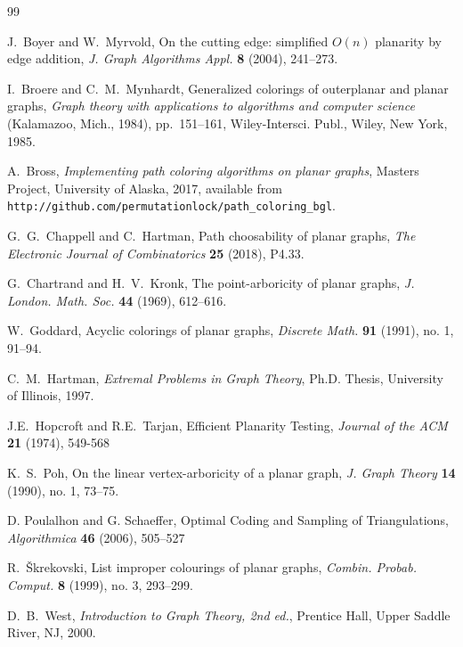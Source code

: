 \documentclass[12pt,letterpaper]{article}
\theoremstyle{plain}
\theoremstyle{definition}
\theoremstyle{break}
\begin{document}
\begin{thebibliography}{99}

J.~Boyer and W.~Myrvold, On the cutting edge: simplified $O(n)$ planarity by edge
addition,
\textit{J. Graph Algorithms Appl.}
\textbf{8} (2004),
241--273.

I.~Broere and C.~M.~Mynhardt,
Generalized colorings of outerplanar and planar graphs,
\textit{Graph theory with applications to algorithms and computer science}
 (Kalamazoo, Mich., 1984),
pp.~151--161,
Wiley-Intersci. Publ., Wiley, New York, 1985.

A.~Bross,
\textit{Implementing path coloring algorithms on planar graphs},
Masters Project,
University of Alaska,
2017,
available from\hfil\break
\texttt{http://github.com/permutationlock/path\_coloring\_bgl}.

G.~G.~Chappell and C.~Hartman,
Path choosability of planar graphs,
\textit{The Electronic Journal of Combinatorics} \textbf{25} (2018),
P4.33.

G.~Chartrand and H.~V.~Kronk,
The point-arboricity of planar graphs,
\textit{J. London. Math. Soc.}
\textbf{44} (1969),
612--616.

W.~Goddard,
Acyclic colorings of planar graphs,
\textit{Discrete Math.}
\textbf{91} (1991), no. 1,
91--94.

C.~M.~Hartman,
\textit{Extremal Problems in Graph Theory},
Ph.D. Thesis, University of Illinois,
1997.

J.E.~Hopcroft and R.E.~Tarjan,
Efficient Planarity Testing,
\textit{Journal of the ACM}
\textbf{21} (1974), 549-568

K.~S.~Poh,
On the linear vertex-arboricity of a planar graph,
\textit{J. Graph Theory}
\textbf{14} (1990), no. 1,
73--75.

D. Poulalhon and G. Schaeffer,
Optimal Coding and Sampling of Triangulations,
\textit{Algorithmica}
\textbf{46} (2006),
505--527

R.~\v{S}krekovski,
List improper colourings of planar graphs,
\textit{Combin. Probab. Comput.}
\textbf{8} (1999), no. 3,
293--299.

D.~B.~West,
\textit{Introduction to Graph Theory, 2nd ed.},
Prentice Hall,
Upper Saddle River, NJ,
2000.

\end{thebibliography}
\end{document}
